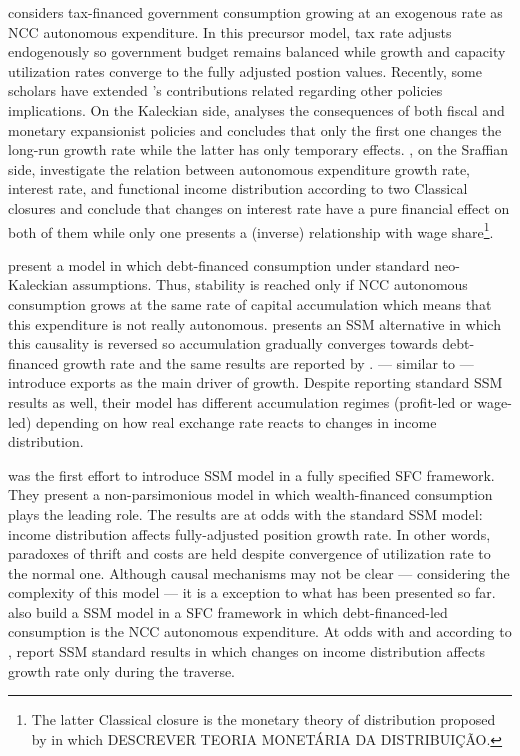 \documentclass[11pt]{article}
\begin{document}
\textcite{allain_tackling_2015} considers tax-financed government consumption growing at an exogenous rate as NCC autonomous expenditure. 
In this precursor model, tax rate adjusts endogenously so  government budget remains balanced while growth and capacity utilization rates converge to the fully adjusted postion values.
Recently, some scholars have extended \citeauthor*{allain_tackling_2015}'s contributions related regarding other policies implications.
On the Kaleckian side, \textcite{bougrine_autonomous_2020} analyses the consequences of both fiscal and monetary expansionist policies and concludes that only the first one changes the long-run growth rate while the latter has only temporary effects.
\textcite{freitas-2020-basel-super}, on the Sraffian side, investigate the relation between autonomous expenditure growth rate, interest rate, and functional income distribution according to two Classical closures and conclude that changes on interest rate have a pure financial effect on both of them  while only one presents a (inverse) relationship with wage share\footnote{The latter Classical closure is the monetary theory of distribution proposed by \textcite{pivetti_essay_1992} in which DESCREVER TEORIA MONETÁRIA DA DISTRIBUIÇÃO.}.

\textcites{dutt_maturity_2006}{palley_inside_2010}{hein_finance-dominated_2012} present a model in which debt-financed consumption under standard neo-Kaleckian assumptions.
Thus, stability is reached only if NCC autonomous consumption grows at the same rate of capital accumulation which means that this expenditure is not really autonomous. 
\textcite{pariboni_autonomous_2015} presents an SSM alternative in which this causality is reversed so accumulation gradually converges towards debt-financed growth rate and the same results are reported by \textcite{lavoie_convergence_2016}.
\textcite{nah_long-run_2017} --- similar to \textcite{dejuan_hidden_2017} --- introduce exports as the main driver of growth. 
Despite reporting standard SSM results as well, their model has different accumulation regimes (profit-led or wage-led) depending on how real exchange rate reacts to changes in income distribution.

\textcite{brochier_supermultiplier_2018} was the first effort to introduce SSM model in a fully specified SFC framework. 
They present a non-parsimonious model in which wealth-financed consumption plays the leading role.
The results are at odds with the standard SSM model: income distribution affects fully-adjusted position growth rate.
In other words, paradoxes of thrift and costs are held despite convergence of utilization rate to the normal one.
Although causal mechanisms may not be clear --- considering the complexity of this model --- it is a  exception to what has been presented so far.
\textcite{mandarino-2020-worker-debt} also build a SSM model in a SFC framework in which debt-financed-led consumption is the NCC autonomous expenditure.
At odds with \textcite{brochier_supermultiplier_2018} and according to \textcites{pariboni_autonomous_2015}{lavoie_convergence_2016}, \textcite{mandarino-2020-worker-debt} report SSM standard results in which changes on income distribution affects growth rate only during the traverse.
\end{document}
